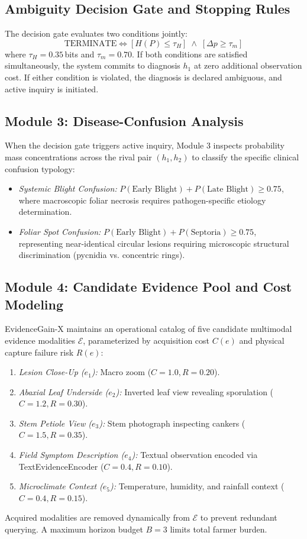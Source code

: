 \documentclass[conference]{IEEEtran}
\begin{document}
\subsection{Ambiguity Decision Gate and Stopping Rules}
The decision gate evaluates two conditions jointly:
\begin{equation}
    \text{TERMINATE} \iff \left[ H(P) \le \tau_H \right] \;\wedge\; \left[ \Delta p \ge \tau_m \right]
\end{equation}
where $\tau_H = 0.35$\,bits and $\tau_m = 0.70$. If both conditions are satisfied simultaneously, the system commits to diagnosis $h_1$ at zero additional observation cost. If either condition is violated, the diagnosis is declared ambiguous, and active inquiry is initiated.

\subsection{Module 3: Disease-Confusion Analysis}
When the decision gate triggers active inquiry, Module 3 inspects probability mass concentrations across the rival pair $(h_1, h_2)$ to classify the specific clinical confusion typology:
\begin{itemize}
    \item \textit{Systemic Blight Confusion:} $P(\text{Early Blight}) + P(\text{Late Blight}) \ge 0.75$, where macroscopic foliar necrosis requires pathogen-specific etiology determination.
    \item \textit{Foliar Spot Confusion:} $P(\text{Early Blight}) + P(\text{Septoria}) \ge 0.75$, representing near-identical circular lesions requiring microscopic structural discrimination (pycnidia vs. concentric rings).
\end{itemize}

\subsection{Module 4: Candidate Evidence Pool and Cost Modeling}
EvidenceGain-X maintains an operational catalog of five candidate multimodal evidence modalities $\mathcal{E}$, parameterized by acquisition cost $C(e)$ and physical capture failure risk $R(e)$:
\begin{enumerate}
    \item \textit{Lesion Close-Up ($e_1$):} Macro zoom ($C = 1.0, R = 0.20$).
    \item \textit{Abaxial Leaf Underside ($e_2$):} Inverted leaf view revealing sporulation ($C = 1.2, R = 0.30$).
    \item \textit{Stem Petiole View ($e_3$):} Stem photograph inspecting cankers ($C = 1.5, R = 0.35$).
    \item \textit{Field Symptom Description ($e_4$):} Textual observation encoded via TextEvidenceEncoder ($C = 0.4, R = 0.10$).
    \item \textit{Microclimate Context ($e_5$):} Temperature, humidity, and rainfall context ($C = 0.4, R = 0.15$).
\end{enumerate}
Acquired modalities are removed dynamically from $\mathcal{E}$ to prevent redundant querying. A maximum horizon budget $B = 3$ limits total farmer burden.
\end{document}
